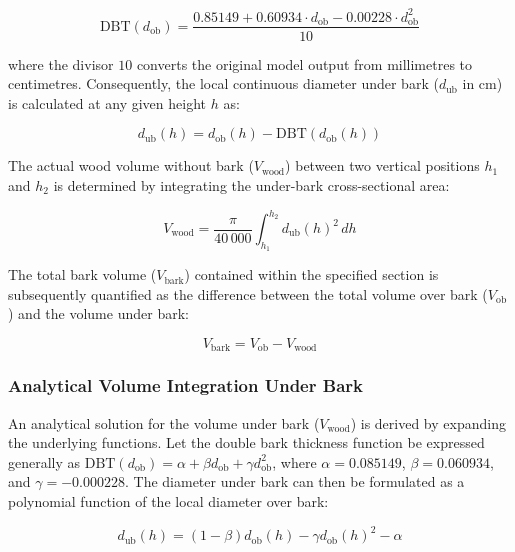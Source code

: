 \documentclass[twocolumn, bibliography=totoc]{scrartcl}
\begin{document}
\begin{equation}
    \text{DBT}(d_{\text{ob}}) = \frac{0.85149 + 0.60934 \cdot d_{\text{ob}} - 0.00228 \cdot d_{\text{ob}}^2}{10}
\end{equation}

\noindent where the divisor $10$ converts the original model output from millimetres to centimetres. Consequently, the local continuous diameter under bark ($d_{\text{ub}}$ in \unit{cm}) is calculated at any given height $h$ as:

\begin{equation}
    d_{\text{ub}}(h) = d_{\text{ob}}(h) - \text{DBT}(d_{\text{ob}}(h))
\end{equation}

The actual wood volume without bark ($V_{\text{wood}}$) between two vertical positions $h_1$ and $h_2$ is determined by integrating the under-bark cross-sectional area:

\begin{equation}
    V_{\text{wood}} = \frac{\pi}{40\,000} \int_{h_1}^{h_2} d_{\text{ub}}(h)^2 \, dh
\end{equation}

The total bark volume ($V_{\text{bark}}$) contained within the specified section is subsequently quantified as the difference between the total volume over bark ($V_{\text{ob}}$) and the volume under bark:

\begin{equation}
    V_{\text{bark}} = V_{\text{ob}} - V_{\text{wood}}
\end{equation}

\subsubsection{Analytical Volume Integration Under Bark}

An analytical solution for the volume under bark ($V_{\text{wood}}$) is derived by expanding the underlying functions. Let the double bark thickness function be expressed generally as $\text{DBT}(d_{\text{ob}}) = \alpha + \beta d_{\text{ob}} + \gamma d_{\text{ob}}^2$, where $\alpha = 0.085149$, $\beta = 0.060934$, and $\gamma = -0.000228$. The diameter under bark can then be formulated as a polynomial function of the local diameter over bark:

\begin{equation}
    d_{\text{ub}}(h) = (1-\beta)d_{\text{ob}}(h) - \gamma d_{\text{ob}}(h)^2 - \alpha
\end{equation}
\end{document}
